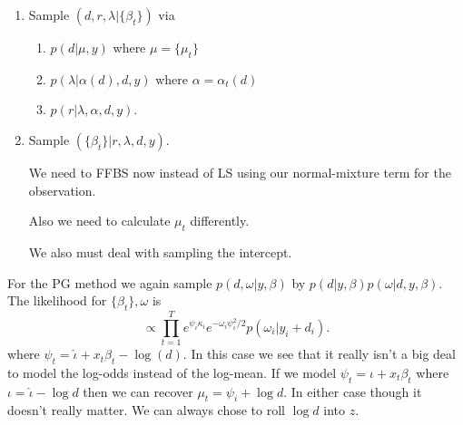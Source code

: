\documentclass{article}
\begin{document}
\begin{enumerate}

\item Sample $(d, r, \lambda | \{\beta_t\})$ via

\begin{enumerate}
\item $p(d | \mu, y)$ where $\mu = \{\mu_t\}$
\item $p(\lambda | \alpha(d), d, y)$ where $\alpha = \alpha_t(d)$
\item $p(r | \lambda, \alpha, d, y)$.
\end{enumerate}

\item Sample $( \{\beta_t\} | r, \lambda, d, y )$.

  We need to FFBS now instead of LS using our normal-mixture term for the
  observation.

  Also we need to calculate $\mu_t$ differently.

  We also must deal with sampling the intercept.

\end{enumerate}

For the PG method we again sample $p(d, \omega | y, \beta)$ by $p(d | y, \beta)
p(\omega | d, y, \beta)$.  The likelihood for $\{\beta_t\}, \omega$ is
\[
\propto \prod_{t=1}^T e^{\psi_i \kappa_i} e^{-\omega_i \psi_i^2 / 2} p(\omega_i | y_i + d_i).
\]
where $\psi_t = \hat \iota + x_t \beta_t - \log(d)$.  In this case we see that
it really isn't a big deal to model the log-odds instead of the log-mean.  If we
model $\psi_t = \iota + x_t \beta_t$ where $\iota = \hat \iota - \log d$ then we
can recover $\mu_t = \psi_i + \log d$.  In either case though it doesn't really
matter.  We can always chose to roll $\log d$ into $z$.
\end{document}
